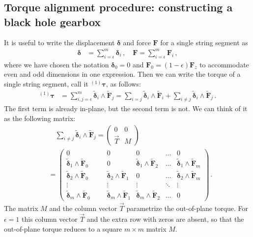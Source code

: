 \documentclass[superscriptaddress,twocolumn,showpacs,
preprintnumbers,amsmath,amssymb,nofootinbib,
longbibliography,aps,prd,10pt]{revtex4-1}
\newcommand{\ts}[1]{{\boldsymbol{#1}}}         %
\begin{document}
\subsection{Torque alignment procedure: constructing a black hole gearbox}
It is useful to write the displacement $\ts{\delta}$ and force $\ts{F}$ for a single string segment as
\begin{align}
\ts{\delta} &= \sum\limits_{i=\epsilon}^m \ts{\delta}_i \, , \quad \ts{F} = \sum\limits_{i=\epsilon}^m \ts{F}_i \, ,
\end{align}
where we have chosen the notation $\ts{\delta}_0 = 0$ and $\ts{F}_{0} = (1-\epsilon) \ts{F}_z$ to accommodate even and odd dimensions in one expression. Then we can write the torque of a single string segment, call it ${}^{(1)}\ts{\tau}$, as follows:
\begin{align}
{}^{(1)}\ts{\tau} &= \sum\limits_{i,j=\epsilon}^m \tilde{\ts{\delta}}_i \wedge \tilde{\ts{F}}_j = \sum\limits_{i=j} \tilde{\ts{\delta}}_i \wedge \tilde{\ts{F}}_i + \sum\limits_{i\not=j} \tilde{\ts{\delta}}_i \wedge \tilde{\ts{F}}_j \, .
\end{align}
The first term is already in-plane, but the second term is not. We can think of it as the following matrix:
\begin{align}
&\quad \sum\limits_{i\not=j} \tilde{\ts{\delta}}_i \wedge \tilde{\ts{F}}_j = \begin{pmatrix} 0 & 0 \\ \vec{T} & M \end{pmatrix} \\
&= \begin{pmatrix} 0 & \hspace{10pt} & 0 & 0 & \dots & 0 \\[10pt]
\tilde{\ts{\delta}}_1 \wedge \tilde{\ts{F}}_0 && 0 & \tilde{\ts{\delta}}_1 \wedge \tilde{\ts{F}}_2 & \dots & \tilde{\ts{\delta}}_1 \wedge \tilde{\ts{F}}_m \\
\tilde{\ts{\delta}}_2 \wedge \tilde{\ts{F}}_0 && \tilde{\ts{\delta}}_2 \wedge \tilde{\ts{F}}_1 & 0 & \dots & \tilde{\ts{\delta}}_2 \wedge \tilde{\ts{F}}_m \\
\vdots && \vdots & \vdots & \ddots & \vdots \\
\tilde{\ts{\delta}}_m \wedge \tilde{\ts{F}}_0 && \tilde{\ts{\delta}}_m \wedge \tilde{\ts{F}}_1 & \tilde{\ts{\delta}}_m \wedge \tilde{\ts{F}}_2 & \dots & 0 \end{pmatrix} \, . \nonumber
\end{align}
The matrix $M$ and the column vector $\vec{T}$ parametrize the out-of-plane torque. For $\epsilon=1$ this column vector $\vec{T}$ and the extra row with zeros are absent, so that the out-of-plane torque reduces to a square $m\times m$ matrix $M$.
\end{document}

